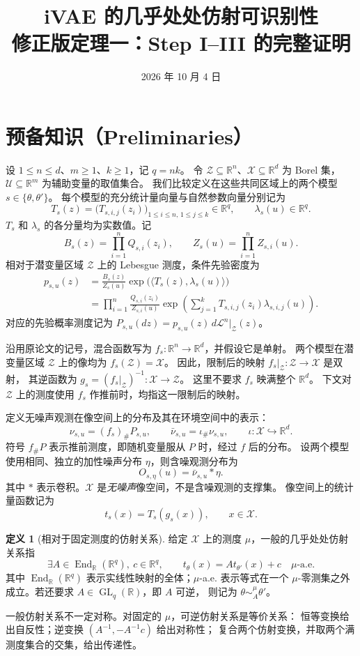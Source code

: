 \documentclass[UTF8,fontset=fandol,11pt,a4paper]{ctexart}
\title{iVAE 的几乎处处仿射可识别性\\
\large 修正版定理一：Step I--III 的完整证明}
\author{}
\date{2026 年 10 月 4 日}
\theoremstyle{definition}
\newtheorem{definition}{定义}
\newcommand{\R}{\mathbb R}
\newcommand{\Zset}{\mathcal Z}
\newcommand{\Xset}{\mathcal X}
\newcommand{\Uset}{\mathcal U}
\newcommand{\aev}{\text{-a.e.}}
\newcommand{\push}{_{\#}}
\newcommand{\GL}{\operatorname{GL}}
\newcommand{\End}{\operatorname{End}}
\newcommand{\Leb}{\mathcal L}
\newcommand{\ip}[2]{\langle #1,#2\rangle}
\begin{document}
\maketitle
\vspace{-2em}

\section{预备知识（Preliminaries）}

设 $1\le n\le d$、$m\ge1$、$k\ge1$，记 $q=nk$。
令 $\Zset\subseteq\R^n$、$\Xset\subseteq\R^d$ 为 Borel 集，
$\Uset\subseteq\R^m$ 为辅助变量的取值集合。
我们比较定义在这些共同区域上的两个模型 $s\in\{\theta,\theta'\}$。
每个模型的充分统计量向量与自然参数向量分别记为
\[
 T_s(z)=\bigl(T_{s,i,j}(z_i)\bigr)_{1\le i\le n,\,1\le j\le k}\in\R^q,
 \qquad \lambda_s(u)\in\R^q.
\]
$T_s$ 和 $\lambda_s$ 的各分量均为实数值。记
\[
 B_s(z)=\prod_{i=1}^n Q_{s,i}(z_i),\qquad
 Z_s(u)=\prod_{i=1}^n Z_{s,i}(u).
\]
相对于潜变量区域 $\Zset$ 上的 Lebesgue 测度，条件先验密度为
\begin{align}
 p_{s,u}(z)
 &=\frac{B_s(z)}{Z_s(u)}
   \exp\!\bigl(\ip{T_s(z)}{\lambda_s(u)}\bigr) \label{eq:prior}\\
 &=\prod_{i=1}^n\frac{Q_{s,i}(z_i)}{Z_{s,i}(u)}
   \exp\!\left(\sum_{j=1}^k T_{s,i,j}(z_i)\lambda_{s,i,j}(u)\right).
 \nonumber
\end{align}
对应的先验概率测度记为
$P_{s,u}(dz)=p_{s,u}(z)\,d\Leb^n|_{\Zset}(z)$。

沿用原论文的记号，混合函数写为 $f_s:\R^n\to\R^d$，并假设它是单射。
两个模型在潜变量区域 $\Zset$ 上的像均为 $f_s(\Zset)=\Xset$。
因此，限制后的映射 $f_s|_{\Zset}:\Zset\to\Xset$ 是双射，
其逆函数为 $g_s=(f_s|_{\Zset})^{-1}:\Xset\to\Zset$。
这里不要求 $f_s$ 映满整个 $\R^d$。
下文对 $\Zset$ 上的测度使用 $f_s$ 作推前时，均指这一限制后的映射。

定义无噪声观测在像空间上的分布及其在环境空间中的表示：
\[
 \nu_{s,u}=(f_s)\push P_{s,u},\qquad
 \bar\nu_{s,u}=\iota\push\nu_{s,u},\qquad
 \iota:\Xset\hookrightarrow\R^d.
\]
符号 $f\push P$ 表示推前测度，即随机变量服从 $P$ 时，经过 $f$ 后的分布。
设两个模型使用相同、独立的加性噪声分布 $\eta$，则含噪观测分布为
\begin{equation}
 O_{s,\eta}(u)=\bar\nu_{s,u}*\eta. \label{eq:observed}
\end{equation}
其中 $*$ 表示卷积。$\Xset$ 是\emph{无噪声}像空间，不是含噪观测的支撑集。
像空间上的统计量函数记为
\[
 t_s(x)=T_s(g_s(x)),\qquad x\in\Xset.
\]

\begin{definition}[相对于固定测度的仿射关系]
给定 $\Xset$ 上的测度 $\mu$，一般的几乎处处仿射关系指
\[
 \exists A\in\End_{\R}(\R^q),\ c\in\R^q,
 \qquad t_\theta(x)=A t_{\theta'}(x)+c\quad\mu\aev
\]
其中 $\End_{\R}(\R^q)$ 表示实线性映射的全体；$\mu$-a.e. 表示等式在一个
$\mu$-零测集之外成立。若还要求 $A\in\GL_q(\R)$，即 $A$ 可逆，
则记为 $\theta\sim_A^\mu\theta'$。
\end{definition}
一般仿射关系不一定对称。对固定的 $\mu$，可逆仿射关系是等价关系：
恒等变换给出自反性；逆变换 $(A^{-1},-A^{-1}c)$ 给出对称性；
复合两个仿射变换，并取两个满测度集合的交集，给出传递性。
\end{document}
